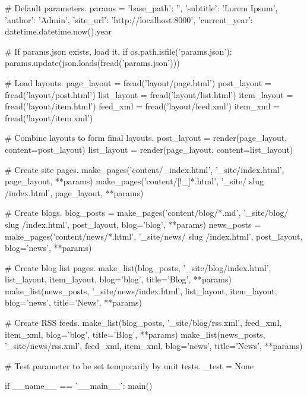 \documentclass[a2,portrait]{a0poster}
\begin{document}
\begin{multicols*}{2}
\begin{pythoncode}
    # Default parameters.
    params = {
        'base_path': '',
        'subtitle': 'Lorem Ipsum',
        'author': 'Admin',
        'site_url': 'http://localhost:8000',
        'current_year': datetime.datetime.now().year
    }

    # If params.json exists, load it.
    if os.path.isfile('params.json'):
        params.update(json.loads(fread('params.json')))

    # Load layouts.
    page_layout = fread('layout/page.html')
    post_layout = fread('layout/post.html')
    list_layout = fread('layout/list.html')
    item_layout = fread('layout/item.html')
    feed_xml = fread('layout/feed.xml')
    item_xml = fread('layout/item.xml')

    # Combine layouts to form final layouts.
    post_layout = render(page_layout, content=post_layout)
    list_layout = render(page_layout, content=list_layout)

    # Create site pages.
    make_pages('content/_index.html', '_site/index.html',
               page_layout, **params)
    make_pages('content/[!_]*.html', '_site/{{ slug }}/index.html',
               page_layout, **params)

    # Create blogs.
    blog_posts = make_pages('content/blog/*.md',
                            '_site/blog/{{ slug }}/index.html',
                            post_layout, blog='blog', **params)
    news_posts = make_pages('content/news/*.html',
                            '_site/news/{{ slug }}/index.html',
                            post_layout, blog='news', **params)

    # Create blog list pages.
    make_list(blog_posts, '_site/blog/index.html',
              list_layout, item_layout, blog='blog', title='Blog', **params)
    make_list(news_posts, '_site/news/index.html',
              list_layout, item_layout, blog='news', title='News', **params)

    # Create RSS feeds.
    make_list(blog_posts, '_site/blog/rss.xml',
              feed_xml, item_xml, blog='blog', title='Blog', **params)
    make_list(news_posts, '_site/news/rss.xml',
              feed_xml, item_xml, blog='news', title='News', **params)


# Test parameter to be set temporarily by unit tests.
_test = None


if __name__ == '__main__':
    main()
\end{pythoncode} 
\end{multicols*}
\end{document}
